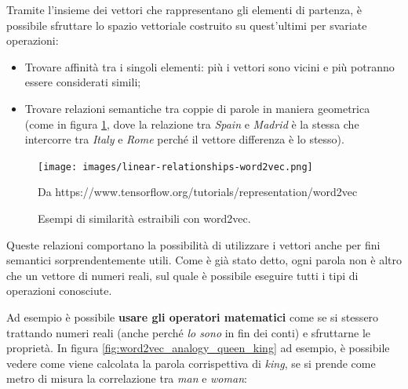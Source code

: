 \documentclass[12pt,a4paper,twoside,openright]{book}
\begin{document}
Tramite l'insieme dei vettori che rappresentano gli elementi di partenza, è possibile sfruttare lo spazio vettoriale costruito su quest'ultimi per svariate operazioni:
\begin{itemize}
    \item Trovare affinità tra i singoli elementi: più i vettori sono vicini e più potranno essere considerati simili;
    \item Trovare relazioni semantiche tra coppie di parole in maniera geometrica (come in figura \ref{fig:word2vec}, dove la relazione tra \emph{Spain} e \emph{Madrid} è la stessa che intercorre tra \emph{Italy} e \emph{Rome} perché il vettore differenza è lo stesso).
\end{itemize}

\begin{figure}[H]
\centering
\texttt{[image: images/linear-relationships-word2vec.png]}
\caption{Esempi di similarità estraibili con word2vec.}
\tiny{Da https://www.tensorflow.org/tutorials/representation/word2vec}
\label{fig:word2vec}
\end{figure}

Queste relazioni comportano la possibilità di utilizzare i vettori anche per fini semantici sorprendentemente utili. Come è già stato detto, ogni parola non è altro che un vettore di numeri reali, sul quale è possibile eseguire tutti i tipi di operazioni conosciute.

Ad esempio è possibile \textbf{usare gli operatori matematici} come se si stessero trattando numeri reali (anche perché \emph{lo sono} in fin dei conti) e sfruttarne le proprietà. In figura \ref{fig:word2vec_analogy_queen_king} ad esempio, è possibile vedere come viene calcolata la parola corrispettiva di \emph{king}, se si prende come metro di misura la correlazione tra \emph{man} e \emph{woman}:
\end{document}
